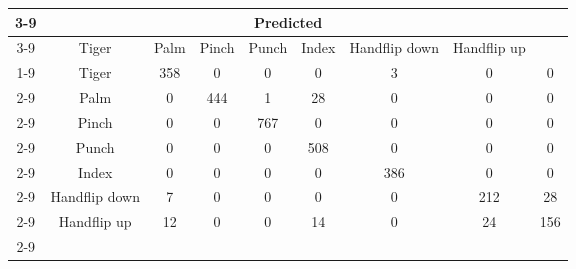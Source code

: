 \documentclass{standalone}
\begin{document}
 
 \begin{tabular}{|c |c |c |c |c |c |c |c |c |}
\cline{3-9}\multicolumn{2}{c|}{} & \multicolumn{7}{c|}{Predicted} \\ 
\cline{3-9} \multicolumn{2}{c |}{ } & Tiger & Palm & Pinch & Punch & Index & Handflip down & Handflip up\\ 
\cline{1-9}\multirow{7}{*}{\rotatebox[origin=c]{90}{Actual}} & Tiger & 358 & 0 & 0 & 0 & 3 & 0 & 0\\ 
 \cline{2-9} & Palm & 0 & 444 & 1 & 28 & 0 & 0 & 0\\ 
 \cline{2-9} & Pinch & 0 & 0 & 767 & 0 & 0 & 0 & 0\\ 
 \cline{2-9} & Punch & 0 & 0 & 0 & 508 & 0 & 0 & 0\\ 
 \cline{2-9} & Index & 0 & 0 & 0 & 0 & 386 & 0 & 0\\ 
 \cline{2-9} & Handflip down & 7 & 0 & 0 & 0 & 0 & 212 & 28\\ 
 \cline{2-9} & Handflip up & 12 & 0 & 0 & 14 & 0 & 24 & 156\\ 
 \cline{2-9}\hline \end{tabular}
 
\end{document}
